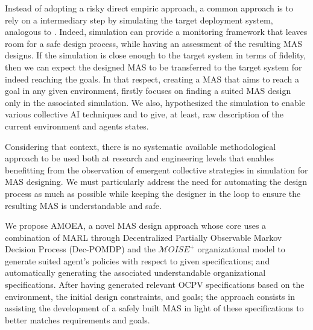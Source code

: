 \documentclass[runningheads]{llncs}
\begin{document}
Instead of adopting a risky direct empiric approach, a common approach is to rely on a intermediary step by simulating the target deployment system, analogous to . Indeed, simulation can provide a monitoring framework that leaves room for a safe design process, while having an assessment of the resulting MAS designs. If the simulation is close enough to the target system in terms of fidelity, then we can expect the designed MAS to be transferred to the target system for indeed reaching the goals.
In that respect, creating a MAS that aims to reach a goal in any given environment, firstly focuses on finding a suited MAS design only in the associated simulation.
We also, hypothesized the simulation to enable various collective AI techniques and to give, at least, raw description of the current environment and agents states.

Considering that context, there is no systematic available methodological approach to be used both at research and engineering levels that enables benefitting from the observation of emergent collective strategies in simulation for MAS designing.
We must particularly address the need for automating the design process as much as possible while keeping the designer in the loop to ensure the resulting MAS is understandable and safe.



We propose AMOEA, a novel MAS design approach whose core uses a combination of MARL through Decentralized Partially Observable Markov Decision Process (Dec-POMDP) and the $\mathcal{M}OISE^+$ organizational model to generate suited agent's policies with respect to given specifications; and automatically generating the associated understandable organizational specifications. After having generated relevant OCPV specifications based on the environment, the initial design constraints, and goals; the approach consists in assisting the development of a safely built MAS in light of these specifications to better matches requirements and goals.
\end{document}
